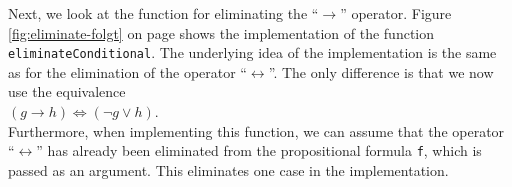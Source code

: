 Next, we look at the function for eliminating the ``$\rightarrow$'' operator. 
Figure
\ref{fig:eliminate-folgt} on page \pageref{fig:eliminate-folgt} shows the
implementation of the function
\texttt{eliminateConditional}.
The underlying idea of the implementation is the same as for the elimination of the
operator ``$\leftrightarrow$''.  The only difference is that we now use the
equivalence \\[0.2cm]
\hspace*{1.3cm}
$(g \rightarrow h) \Leftrightarrow (\neg g \vee h)$. \\[0.2cm]
Furthermore, when implementing this function, we can assume that the operator ``$\leftrightarrow$''
has already been eliminated from the propositional formula \texttt{f}, which is passed as an argument.
This eliminates one case in the implementation. 



